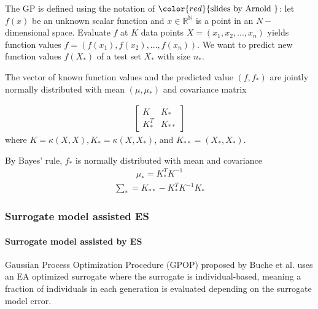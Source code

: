 The GP is defined using the notation of $\color{red}{\text{slides by Arnold }}$: let $f(x)$ be an unknown scalar function and $x \in \mathbb{R^N}$ is a point in an $N-$dimensional space. Evaluate $f$ at $K$ data points $X=(x_1,x_2,...,x_n)$ yields function values $f = (f(x_1),f(x_2),...,f(x_n))$. We want to predict new function values $f(X_*)$ of a test set $X_*$ with size $n_*$.

The vector of known function values and the predicted value $(f,f_*)$ are jointly normally distributed with mean $(\mu,\mu_*)$ and covariance matrix

\begin{align}
\begin{bmatrix}
K & K_*\\
K_*^T&K_{**}
\end{bmatrix}
\end{align}
where $K = \kappa(X,X),K_* = \kappa (X,X_*)$, and $K_{**} = (X_*,X_*)$. 

By Bayes' rule, $f_*$ is normally distributed with mean and covariance 
\begin{align}\label{eqn:GP_mean}{}
\mu_* = K_*^T K^{-1}
\end{align}
\begin{align}\label{eqn:GP_cov}{}
\sum_* = K_{**}- K_*^TK^{-1}K_*
\end{align}








\subsubsection{Surrogate model assisted ES}\label{sssec:surrogate_assisted_ES}\hfill



\paragraph{Surrogate model assisted by ES}
Gaussian Process Optimization Procedure (GPOP) proposed by Buche et al. \cite{1424193} uses an EA optimized surrogate where the surrogate is individual-based, meaning a fraction of individuals in each generation is evaluated depending on the surrogate model error. 

